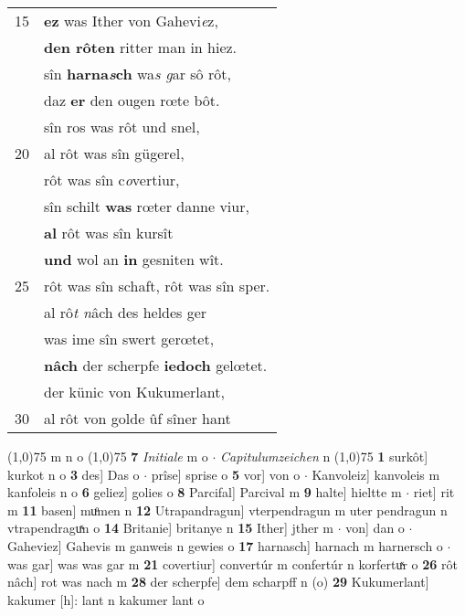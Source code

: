 \documentclass[8pt,a4paper,notitlepage]{article}
\begin{document}
\begin{table}[ht]
\begin{minipage}[t]{0.5\linewidth}
\begin{tabular}{rl}
15 & \textbf{ez} was Ither von Gahevi\textit{e}z,\\ 
 & \textbf{den rôten} ritter man in hiez.\\ 
 & sîn \textbf{harna\textit{s}ch} wa\textit{s g}ar sô rôt,\\ 
 & daz \textbf{er} den ougen rœte bôt.\\ 
 & sîn ros was rôt und snel,\\ 
20 & al rôt was sîn gügerel,\\ 
 & rôt was sîn c\textit{o}vertiur,\\ 
 & sîn schilt \textbf{was} rœter danne viur,\\ 
 & \textbf{al} rôt was sîn kursît\\ 
 & \textbf{und} wol an \textbf{in} gesniten wît.\\ 
25 & rôt was sîn schaft, rôt was sîn sper.\\ 
 & al rô\textit{t n}âch des heldes ger\\ 
 & was ime sîn swert gerœtet,\\ 
 & \textbf{nâch} der scherpfe \textbf{iedoch} gelœtet.\\ 
 & der künic von Kukumerlant,\\ 
30 & al rôt von golde ûf sîner hant\\ 
\end{tabular}
\scriptsize
\line(1,0){75} \newline
m n o \newline
\line(1,0){75} \newline
\textbf{7} \textit{Initiale} m o   $\cdot$ \textit{Capitulumzeichen} n  \newline
\line(1,0){75} \newline
\textbf{1} surkôt] kurkot n o \textbf{3} des] Das o  $\cdot$ prîse] sprise o \textbf{5} vor] von o  $\cdot$ Kanvoleiz] kanvoleis m kanfoleis n o \textbf{6} geliez] golies o \textbf{8} Parcifal] Parcival m \textbf{9} halte] hieltte m  $\cdot$ riet] rit m \textbf{11} basen] muͦmen n \textbf{12} Utrapandragun] vterpendragun m uter pendragun n vtrapendraguͯn o \textbf{14} Britanie] britanye n \textbf{15} Ither] jther m  $\cdot$ von] dan o  $\cdot$ Gaheviez] Gahevis m ganweis n gewies o \textbf{17} harnasch] harnach m harnersch o  $\cdot$ was gar] was was gar m \textbf{21} covertiur] convertúr m confertúr n korfertuͯr o \textbf{26} rôt nâch] rot was nach m \textbf{28} der scherpfe] dem scharpff n (o) \textbf{29} Kukumerlant] kakumer [h]: lant n kakumer lant o \newline
\end{minipage}
\end{table}
\end{document}
